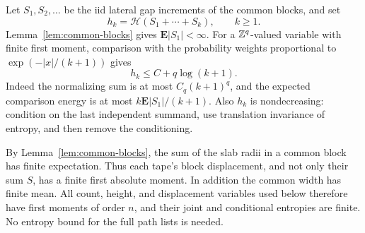 Let $S_1,S_2,\ldots$ be the iid lateral gap increments of the common
blocks, and set
\[
 h_k=\mathcal H(S_1+\cdots+S_k),\qquad k\ge1.
\]
Lemma~\ref{lem:common-blocks} gives $\mathbf E|S_1|<\infty$.  For a
$\mathbb Z^q$-valued variable with finite first moment, comparison with the
probability weights proportional to $\exp(-|x|/(k+1))$ gives
\begin{equation}\label{eq:gap-entropy-growth}
 h_k\le C+q\log(k+1).
\end{equation}
Indeed the normalizing sum is at most $C_q(k+1)^q$, and the expected
comparison energy is at most $k\mathbf E|S_1|/(k+1)$.  Also $h_k$ is
nondecreasing: condition on the last independent summand, use translation
invariance of entropy, and then remove the conditioning.

By Lemma~\ref{lem:common-blocks}, the sum of the slab radii in a common
block has finite expectation.  Thus each tape's block displacement,
and not only their sum $S$, has a finite first absolute moment.  In
addition the common width has finite mean.  All count, height, and
displacement variables used below therefore have first moments of
order $n$, and their joint and conditional entropies are finite.
No entropy bound for the full path lists is needed.

